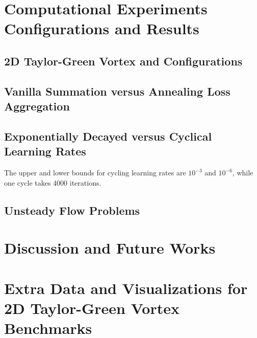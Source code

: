 \documentclass[font=Times]{gw-dissertation}[2021/11/19]
\begin{document}
\chapter{Computational Experiments Configurations and Results}

    \section{2D Taylor-Green Vortex and Configurations}
    

    \section{Vanilla Summation versus Annealing Loss Aggregation}

    \section{Exponentially Decayed versus Cyclical Learning Rates}
    The upper and lower bounds for cycling learning rates are $10^{-3}$ and $10^{-6}$, while one cycle takes 4000 iterations.

    \section{Unsteady Flow Problems}

\chapter{Discussion and Future Works}

\appendix
\chapter{Extra Data and Visualizations for 2D Taylor-Green Vortex Benchmarks}\label{section:extra-data}

\end{document}
